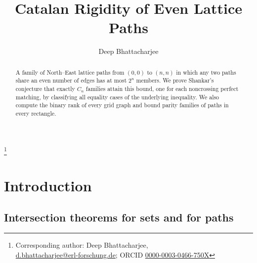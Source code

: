 \documentclass[11pt]{amsart}
\theoremstyle{definition}
\theoremstyle{remark}
\numberwithin{equation}{section}
\begin{document}
\title{Catalan Rigidity of Even Lattice Paths}

\author{Deep Bhattacharjee}
\address{Formerly, Electro-Gravitational Space Propulsion Laboratory (EGSPL),\newline Bhubaneswar, Odisha 751030, India\newline
Formerly, University of Calcutta (Heramba Chandra College),/49 Gariahat Road, Golpark, Kolkata 700029, West Bengal, India}
\thanks{Corresponding author: Deep Bhattacharjee,\\ \href{mailto:d.bhattacharjee@erl-forschung.de}{d.bhattacharjee@erl-forschung.de}; ORCID \href{https://orcid.org/0000-0003-0466-750X}{\mbox{0000-0003-0466-750X}}}


\begin{abstract}
A family of North--East lattice paths from $(0,0)$ to $(n,n)$ in which any two paths share an even number of edges has at most $2^n$ members. We prove Shankar's conjecture that exactly $C_n$ families attain this bound, one for each noncrossing perfect matching, by classifying all equality cases of the underlying inequality. We also compute the binary rank of every grid graph and bound parity families of paths in every rectangle.
\end{abstract}

\maketitle

\section{Introduction}\label{sec:intro}

\subsection{Intersection theorems for sets and for paths}
\end{document}
